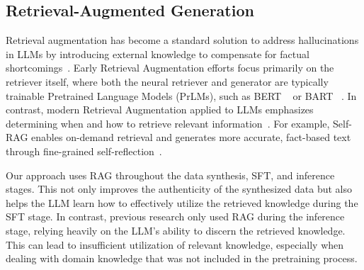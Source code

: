 \subsection{Retrieval-Augmented Generation}
Retrieval augmentation has become a standard solution to address hallucinations in LLMs by introducing external knowledge to compensate for factual shortcomings~\cite{Asai2023SelfRAGLT,ma2023query, Izacard2021UnsupervisedDI, Ram2023InContextRL}.
Early Retrieval Augmentation efforts focus primarily on the retriever itself, where both the neural retriever and generator are typically trainable Pretrained Language Models (PrLMs), such as BERT ~\cite{Devlin2019BERTPO} or BART ~\cite{Lewis2019BARTDS}. In contrast, modern Retrieval Augmentation applied to LLMs emphasizes determining when and how to retrieve relevant information~\cite{fatehkia2024t, Asai2023SelfRAGLT, Xu2024LargeLM}. For example, Self-RAG enables on-demand retrieval and generates more accurate, fact-based text through fine-grained self-reflection~\cite{Asai2023SelfRAGLT}. 

Our approach uses RAG throughout the data synthesis, SFT, and inference stages. This not only improves the authenticity of the synthesized data but also helps the LLM learn how to effectively utilize the retrieved knowledge during the SFT stage. In contrast, previous research only used RAG during the inference stage, relying heavily on the LLM's ability to discern the retrieved knowledge. This can lead to insufficient utilization of relevant knowledge, especially when dealing with domain knowledge that was not included in the pretraining process.

